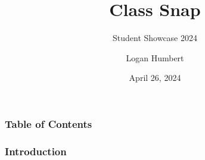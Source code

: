 \documentclass{beamer}
\title{Class Snap}
\subtitle{Student Showcase 2024}
\author{Logan Humbert}
\institute{Colorado Mesa University}
\date{April 26, 2024}
\begin{document}
	\frame{\titlepage}
	
	\begin{frame}
		\frametitle{Table of Contents}
		\tableofcontents
	\end{frame}
	
	\begin{frame}
		\frametitle{Introduction}
		
		
	\end{frame}
\end{document}
